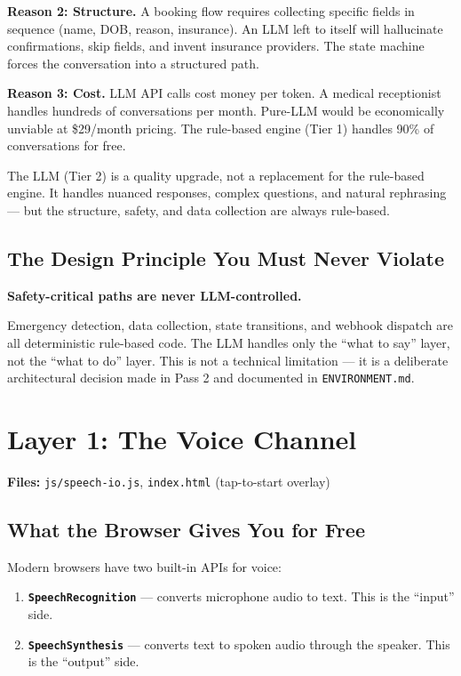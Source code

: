 \documentclass[12pt, a4paper]{report}
\newcommand{\ic}[1]{\texttt{\small\color{accentblue!70!black}#1}}
\begin{document}
\textbf{Reason 2: Structure.} A booking flow requires collecting specific fields in
sequence (name, DOB, reason, insurance). An LLM left to itself will hallucinate
confirmations, skip fields, and invent insurance providers. The state machine forces the
conversation into a structured path.

\textbf{Reason 3: Cost.} LLM API calls cost money per token. A medical receptionist
handles hundreds of conversations per month. Pure-LLM would be economically unviable at
\$29/month pricing. The rule-based engine (Tier 1) handles 90\% of conversations for
free.

The LLM (Tier 2) is a quality upgrade, not a replacement for the rule-based engine. It
handles nuanced responses, complex questions, and natural rephrasing --- but the
structure, safety, and data collection are always rule-based.

\section{The Design Principle You Must Never Violate}

\begin{alertbox}
  \textbf{Safety-critical paths are never LLM-controlled.}

  Emergency detection, data collection, state transitions, and webhook dispatch are all
  deterministic rule-based code. The LLM handles only the ``what to say'' layer, not the
  ``what to do'' layer. This is not a technical limitation --- it is a deliberate
  architectural decision made in Pass 2 and documented in \ic{ENVIRONMENT.md}.
\end{alertbox}

\chapter{Layer 1: The Voice Channel}

\textbf{Files:} \ic{js/speech-io.js}, \ic{index.html} (tap-to-start overlay)

\section{What the Browser Gives You for Free}

Modern browsers have two built-in APIs for voice:

\begin{enumerate}
  \item \textbf{\ic{SpeechRecognition}} --- converts microphone audio to text. This is
        the ``input'' side.
  \item \textbf{\ic{SpeechSynthesis}} --- converts text to spoken audio through the
        speaker. This is the ``output'' side.
\end{enumerate}
\end{document}
